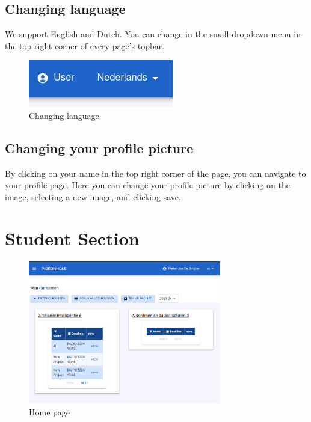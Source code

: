 \documentclass{article}
\begin{document}
\subsection{Changing language}
We support English and Dutch. You can change in the small dropdown menu in the top right corner of every page's topbar.

\begin{figure}[H]
    \centering
    \includegraphics[width=0.5\linewidth]{user_manual//images/select_language.png}
    \caption{Changing language}
    \label{fig:change_language}
\end{figure}

\subsection{Changing your profile picture}
By clicking on your name in the top right corner of the page, you can navigate to your profile page. Here you can change your profile picture by clicking on the image, selecting a new image, and clicking save.

\section{Student Section}

\begin{figure}[H]
    \centering
    \includegraphics[width=0.75\textwidth]{images/home_page.png}
    \caption{Home page}
    \label{fig:home_page}
\end{figure}
\end{document}

